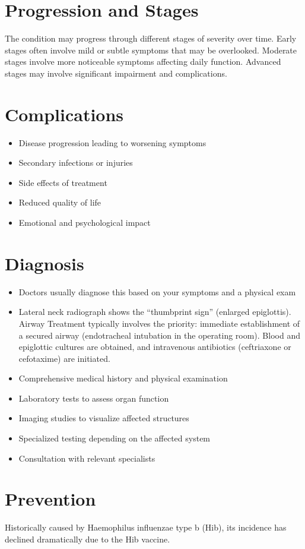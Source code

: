 \section{Progression and Stages}
The condition may progress through different stages of severity over time. Early stages often involve mild or subtle symptoms that may be overlooked. Moderate stages involve more noticeable symptoms affecting daily function. Advanced stages may involve significant impairment and complications.
\section{Complications}
\begin{itemize}[noitemsep]
  \item Disease progression leading to worsening symptoms
  \item Secondary infections or injuries
  \item Side effects of treatment
  \item Reduced quality of life
  \item Emotional and psychological impact
\end{itemize}
\section{Diagnosis}
\begin{itemize}[noitemsep]
  \item Doctors usually diagnose this based on your symptoms and a physical exam
  \item Lateral neck radiograph shows the ``thumbprint sign'' (enlarged epiglottis). Airway Treatment typically involves the priority: immediate establishment of a secured airway (endotracheal intubation in the operating room). Blood and epiglottic cultures are obtained, and intravenous antibiotics (ceftriaxone or cefotaxime) are initiated.
  \item Comprehensive medical history and physical examination
  \item Laboratory tests to assess organ function
  \item Imaging studies to visualize affected structures
  \item Specialized testing depending on the affected system
  \item Consultation with relevant specialists
\end{itemize}
\section{Prevention}
Historically caused by Haemophilus influenzae type b (Hib), its incidence has declined dramatically due to the Hib vaccine.

